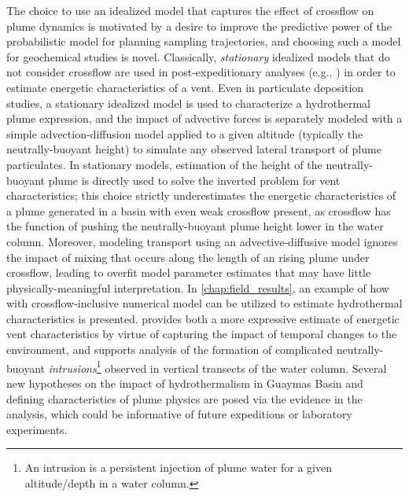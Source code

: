 The choice to use an idealized model that captures the effect of crossflow on plume dynamics is motivated by a desire to improve the predictive power of the probabilistic model for planning sampling trajectories, and choosing such a model for geochemical studies is novel.
Classically, \emph{stationary} idealized models that do not consider crossflow are used in post-expeditionary analyses (e.g., \cite{barreyre2012structure,mittelstaedt2012quantifying,murch2020volcaniclastic}) in order to estimate energetic characteristics of a vent.
Even in particulate deposition studies, a stationary idealized model is used to characterize a hydrothermal plume expression, and the impact of advective forces is separately modeled with a simple advection-diffusion model applied to a given altitude (typically the neutrally-buoyant height) to simulate any observed lateral transport of plume particulates.
In stationary models, estimation of the height of the neutrally-buoyant plume is directly used to solve the inverted problem for vent characteristics; this choice strictly underestimates the energetic characteristics of a plume generated in a basin with even weak crossflow present, as crossflow has the function of pushing the neutrally-buoyant plume height lower in the water column.
Moreover, modeling transport using an advective-diffusive model ignores the impact of mixing that occurs along the length of an rising plume under crossflow, leading to overfit model parameter estimates that may have little physically-meaningful interpretation.
In \cref{chap:field_results}, an example of how \PHUMES with crossflow-inclusive numerical model can be utilized to estimate hydrothermal characteristics is presented.
\PHUMES provides both a more expressive estimate of energetic vent characteristics by virtue of capturing the impact of temporal changes to the environment, and supports analysis of the formation of complicated neutrally-buoyant \emph{intrusions}\footnote{An intrusion is a persistent injection of plume water for a given altitude/depth in a water column.} observed in vertical transects of the water column.
Several new hypotheses on the impact of hydrothermalism in Guaymas Basin and defining characteristics of plume physics are posed via the evidence in the analysis, which could be informative of future expeditions or laboratory experiments.


